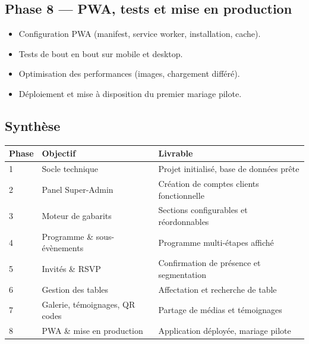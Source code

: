 \documentclass[11pt,a4paper]{article}
\begin{document}
\subsection{Phase 8 --- PWA, tests et mise en production}
\begin{itemize}[leftmargin=1.2cm]
  \item Configuration PWA (manifest, service worker, installation, cache).
  \item Tests de bout en bout sur mobile et desktop.
  \item Optimisation des performances (images, chargement différé).
  \item Déploiement et mise à disposition du premier mariage pilote.
\end{itemize}

\subsection{Synthèse}
\begin{longtable}{L{1.5cm}L{6cm}L{6.5cm}}
\toprule
\textbf{Phase} & \textbf{Objectif} & \textbf{Livrable} \\
\midrule
{} & Socle technique & Projet initialisé, base de données prête \\
2 & Panel Super-Admin & Création de comptes clients fonctionnelle \\
3 & Moteur de gabarits & Sections configurables et réordonnables \\
4 & Programme \& sous-évènements & Programme multi-étapes affiché \\
5 & Invités \& RSVP & Confirmation de présence et segmentation \\
6 & Gestion des tables & Affectation et recherche de table \\
7 & Galerie, témoignages, QR codes & Partage de médias et témoignages \\
8 & PWA \& mise en production & Application déployée, mariage pilote \\
\bottomrule
\end{longtable}
\end{document}
